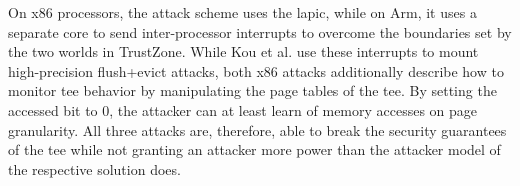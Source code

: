 On x86 processors, the attack scheme uses the \gls{lapic}, while on Arm, it uses
a separate core to send inter-processor interrupts to overcome the boundaries
set by the two worlds in TrustZone. While Kou et al. use these interrupts to
mount high-precision flush+evict attacks, both x86 attacks additionally describe
how to monitor \gls{tee} behavior by manipulating the page tables of the
\gls{tee}. By setting the accessed bit to 0, the attacker can at least learn of
memory accesses on page granularity. All three attacks are, therefore, able to
break the security guarantees of the \gls{tee} while not granting an attacker
more power than the attacker model of the respective solution does.
